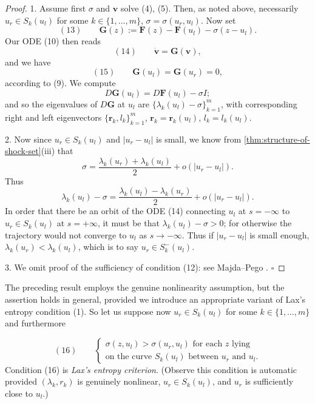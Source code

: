 \begin{proof}
1. Assume first $\sigma$ and $\mathbf{v}$ solve (4), (5). Then, as noted above, necessarily $u_r\in S_k(u_l)$ for some $k\in\{1,\ldots,m\}$, $\sigma=\sigma(u_r,u_l)$. Now set
$$(13) \qquad \mathbf{G}(z) := \mathbf{F}(z) - \mathbf{F}(u_l) - \sigma(z-u_l).$$
Our ODE (10) then reads
$$(14) \qquad \dot{\mathbf{v}} = \mathbf{G}(\mathbf{v}),$$
and we have
$$(15) \qquad \mathbf{G}(u_l) = \mathbf{G}(u_r) = 0,$$
according to (9). We compute
$$D\mathbf{G}(u_l) = D\mathbf{F}(u_l) - \sigma I;$$
and so the eigenvalues of $D\mathbf{G}$ at $u_l$ are $\{\lambda_k(u_l)-\sigma\}_{k=1}^m$, with corresponding right and left eigenvectors $\{\mathbf{r}_k, l_k\}_{k=1}^m$, $\mathbf{r}_k=\mathbf{r}_k(u_l)$, $l_k=l_k(u_l)$.

2. Now since $u_r\in S_k(u_l)$ and $|u_r-u_l|$ is small, we know from \cref{thm:structure-of-shock-set}(iii) that
$$\sigma = \frac{\lambda_k(u_r)+\lambda_k(u_l)}{2} + o(|u_r-u_l|).$$
Thus
$$\lambda_k(u_l) - \sigma = \frac{\lambda_k(u_l)-\lambda_k(u_r)}{2} + o(|u_r-u_l|).$$
In order that there be an orbit of the ODE (14) connecting $u_l$ at $s=-\infty$ to $u_r\in S_k(u_l)$ at $s=+\infty$, it must be that $\lambda_k(u_l)-\sigma>0$; for otherwise the trajectory would not converge to $u_l$ as $s\to-\infty$. Thus if $|u_r-u_l|$ is small enough, $\lambda_k(u_r)<\lambda_k(u_l)$, which is to say $u_r\in S_k^-(u_l)$.

3. We omit proof of the sufficiency of condition (12): see Majda--Pego \cite{MajdaPego1985}. $\square$
\end{proof}

The preceding result employs the genuine nonlinearity assumption, but the assertion holds in general, provided we introduce an appropriate variant of Lax's entropy condition (1). So let us suppose now $u_r\in S_k(u_l)$ for some $k\in\{1,\ldots,m\}$ and furthermore

\begin{definition}
\label{def:lax-entropy-criterion-general}
$$(16) \qquad \begin{cases} \sigma(z,u_l) > \sigma(u_r,u_l) \text{ for each } z \text{ lying} \\ \text{on the curve } S_k(u_l) \text{ between } u_r \text{ and } u_l. \end{cases}$$
Condition (16) is \textit{Lax's entropy criterion}. (Observe this condition is automatic provided $(\lambda_k, r_k)$ is genuinely nonlinear, $u_r\in S_k(u_l)$, and $u_r$ is sufficiently close to $u_l$.)
\end{definition}

